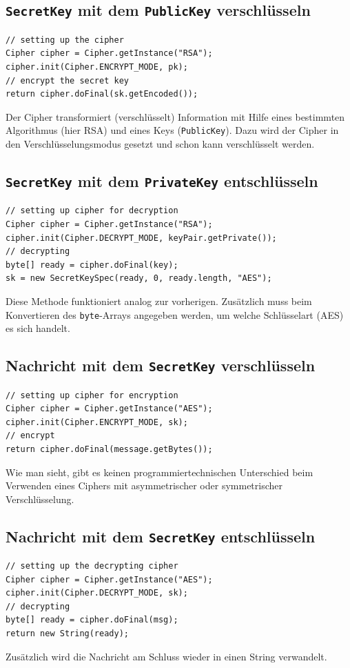 \subsection{\texttt{SecretKey} mit dem \texttt{PublicKey} verschlüsseln}
\begin{lstlisting}[style=Java, caption=\texttt{SecretKey} mit dem \texttt{PublicKey} verschlüsseln]
// setting up the cipher
Cipher cipher = Cipher.getInstance("RSA");
cipher.init(Cipher.ENCRYPT_MODE, pk);
// encrypt the secret key
return cipher.doFinal(sk.getEncoded());
\end{lstlisting}
Der Cipher transformiert (verschlüsselt) Information mit Hilfe eines bestimmten Algorithmus (hier RSA) und eines Keys (\texttt{PublicKey}). Dazu wird der Cipher in den Verschlüsselungsmodus gesetzt und schon kann verschlüsselt werden.
\clearpage
\subsection{\texttt{SecretKey} mit dem \texttt{PrivateKey} entschlüsseln}
\begin{lstlisting}[style=Java, caption=\texttt{SecretKey} mit dem \texttt{PrivateKey} entschlüsseln]
// setting up cipher for decryption
Cipher cipher = Cipher.getInstance("RSA");
cipher.init(Cipher.DECRYPT_MODE, keyPair.getPrivate());
// decrypting
byte[] ready = cipher.doFinal(key);
sk = new SecretKeySpec(ready, 0, ready.length, "AES");
\end{lstlisting}
Diese Methode funktioniert analog zur vorherigen. Zusätzlich muss beim Konvertieren des \texttt{byte}-Arrays angegeben werden, um welche Schlüsselart (AES) es sich handelt.
\subsection{Nachricht mit dem \texttt{SecretKey} verschlüsseln}
\begin{lstlisting}[style=Java, caption=symmetrische Verschlüsselung]
// setting up cipher for encryption
Cipher cipher = Cipher.getInstance("AES");
cipher.init(Cipher.ENCRYPT_MODE, sk);
// encrypt
return cipher.doFinal(message.getBytes());
\end{lstlisting}
Wie man sieht, gibt es keinen programmiertechnischen Unterschied beim Verwenden eines Ciphers mit asymmetrischer oder symmetrischer Verschlüsselung.
\subsection{Nachricht mit dem \texttt{SecretKey} entschlüsseln}
\begin{lstlisting}[style=Java, caption=symmetrische Entschlüsselung]
// setting up the decrypting cipher
Cipher cipher = Cipher.getInstance("AES");
cipher.init(Cipher.DECRYPT_MODE, sk);
// decrypting
byte[] ready = cipher.doFinal(msg);
return new String(ready);
\end{lstlisting}
Zusätzlich wird die Nachricht am Schluss wieder in einen String verwandelt.
